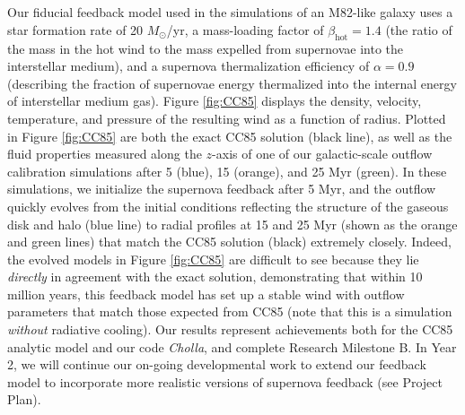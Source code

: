 \documentclass[11pt,letterpaper,english]{article}
\begin{document}
~\\~\\
Our fiducial feedback model used in the simulations of an M82-like galaxy uses a star formation rate of 
20 $M_\odot$/yr, a mass-loading factor of $\beta_\mathrm{hot} = 1.4$ (the ratio of the mass in the hot wind to the
mass expelled from supernovae into the interstellar medium), and a supernova thermalization efficiency of 
$\alpha = 0.9$ (describing the fraction of supernovae energy thermalized into the internal energy of interstellar medium gas). Figure \ref{fig:CC85} displays the density, velocity, temperature, and pressure of the resulting wind as a function of radius. Plotted in Figure \ref{fig:CC85} are both the exact CC85 solution (black line), as well as the fluid properties measured along the $z$-axis of one of our galactic-scale outflow calibration simulations after 5 (blue), 15 (orange), and 25 Myr (green). In these simulations, we initialize the supernova feedback after 5 Myr, and the outflow quickly evolves from the initial conditions reflecting the structure of the gaseous disk and halo (blue line) to radial profiles
at 15 and 25 Myr (shown as the orange and green lines) that match the CC85 solution (black) extremely
closely. Indeed, the evolved models in Figure \ref{fig:CC85} are difficult to see because they lie \textit{directly} in agreement with the exact solution, demonstrating that within 10 million years, this feedback model has set up a stable wind with outflow parameters that match those expected from CC85 (note that this is a simulation \textit{without} radiative cooling). Our results represent achievements both for the CC85 analytic model and our code \textit{Cholla}, and complete Research Milestone B.
In Year 2, we will continue our on-going developmental work to extend our feedback model to incorporate more realistic versions of supernova feedback (see Project Plan).
\end{document}
